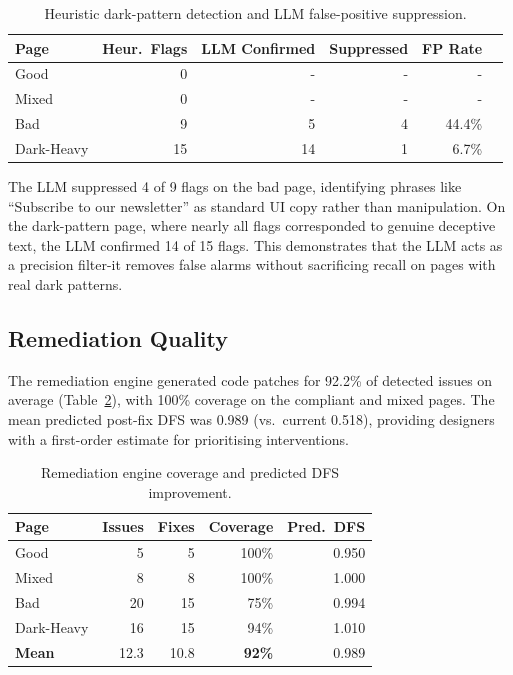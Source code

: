 \documentclass[runningheads]{llncs}
\begin{document}
\begin{table}[H]
\centering
\caption{Heuristic dark-pattern detection and LLM false-positive suppression.}
\label{tab:dp}
\begin{tabular}{@{}lrrrrr@{}}
\toprule
\textbf{Page} & \textbf{Heur.\ Flags} & \textbf{LLM Confirmed} & \textbf{Suppressed} & \textbf{FP Rate} \\
\midrule
Good       & 0  & - & - & -    \\
Mixed      & 0  & - & - & -    \\
Bad        & 9  & 5   & 4   & 44.4\% \\
Dark-Heavy & 15 & 14  & 1   & 6.7\%  \\
\bottomrule
\end{tabular}
\end{table}

The LLM suppressed 4 of 9 flags on the bad page, identifying phrases like ``Subscribe to our newsletter'' as standard UI copy rather than manipulation. On the dark-pattern page, where nearly all flags corresponded to genuine deceptive text, the LLM confirmed 14 of 15 flags. This demonstrates that the LLM acts as a precision filter-it removes false alarms without sacrificing recall on pages with real dark patterns.


\subsection{Remediation Quality}

The remediation engine generated code patches for 92.2\% of detected issues on average (Table~\ref{tab:remed}), with 100\% coverage on the compliant and mixed pages. The mean predicted post-fix DFS was 0.989 (vs.\ current 0.518), providing designers with a first-order estimate for prioritising interventions.

\begin{table}[H]
\centering
\caption{Remediation engine coverage and predicted DFS improvement.}
\label{tab:remed}
\begin{tabular}{@{}lrrrr@{}}
\toprule
\textbf{Page} & \textbf{Issues} & \textbf{Fixes} & \textbf{Coverage} & \textbf{Pred.\ DFS} \\
\midrule
Good       & 5  & 5  & 100\% & 0.950 \\
Mixed      & 8  & 8  & 100\% & 1.000 \\
Bad        & 20 & 15 & 75\%  & 0.994 \\
Dark-Heavy & 16 & 15 & 94\%  & 1.010 \\
\midrule
\textbf{Mean} & 12.3 & 10.8 & \textbf{92\%} & 0.989 \\
\bottomrule
\end{tabular}
\end{table}
\end{document}
